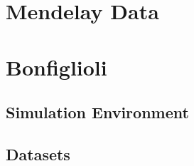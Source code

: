 \documentclass[../main.tex]{subfiles}
\begin{document}
\section{Mendelay Data}


\section{Bonfiglioli}

\subsection{Simulation Environment}

\subsection{Datasets}


	
\end{document}
